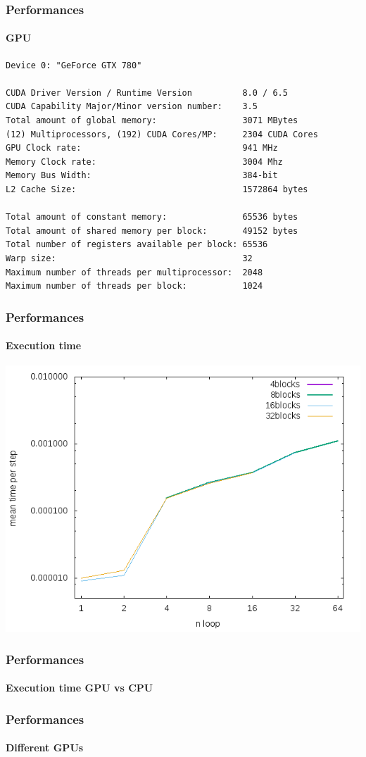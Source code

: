 \begin{frame}[fragile]
\frametitle{Performances}
\framesubtitle{GPU}
\begin{lstlisting}
Device 0: "GeForce GTX 780"

CUDA Driver Version / Runtime Version          8.0 / 6.5
CUDA Capability Major/Minor version number:    3.5
Total amount of global memory:                 3071 MBytes
(12) Multiprocessors, (192) CUDA Cores/MP:     2304 CUDA Cores
GPU Clock rate:                                941 MHz
Memory Clock rate:                             3004 Mhz
Memory Bus Width:                              384-bit
L2 Cache Size:                                 1572864 bytes

Total amount of constant memory:               65536 bytes
Total amount of shared memory per block:       49152 bytes
Total number of registers available per block: 65536
Warp size:                                     32
Maximum number of threads per multiprocessor:  2048
Maximum number of threads per block:           1024
\end{lstlisting}
\begin{center}

\end{center}
\end{frame}

\begin{frame}
\frametitle{Performances}
\framesubtitle{Execution time}
\begin{center}
\includegraphics[scale=0.5]{../check/time/speed.png}
\end{center}
\end{frame}

\begin{frame}
\frametitle{Performances}
\framesubtitle{Execution time GPU vs CPU}
\begin{center}
\end{center}
\end{frame}

\begin{frame}
\frametitle{Performances}
\framesubtitle{Different GPUs}
\begin{center}
\end{center}
\end{frame}
